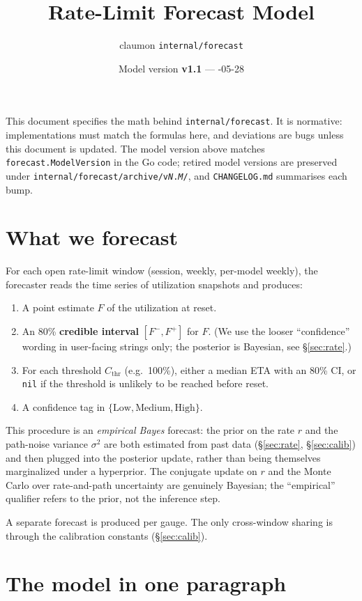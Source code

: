 \documentclass[11pt]{article}
\title{Rate-Limit Forecast Model}
\author{claumon \texttt{internal/forecast}}
\date{Model version \textbf{v1.1} \enspace --- \enspace 2026-05-28}
\newcommand{\Cthr}{C_{\text{thr}}}
\begin{document}
\maketitle

This document specifies the math behind \texttt{internal/forecast}. It is
normative: implementations must match the formulas here, and deviations are
bugs unless this document is updated. The model version above matches
\texttt{forecast.ModelVersion} in the Go code; retired model versions are
preserved under \texttt{internal/forecast/archive/v\textit{N}.\textit{M}/},
and \texttt{CHANGELOG.md} summarises each bump.

\section{What we forecast}

For each open rate-limit window (session, weekly, per-model weekly), the
forecaster reads the time series of utilization snapshots and produces:

\begin{enumerate}
  \item A point estimate $F$ of the utilization at reset.
  \item An 80\% \textbf{credible interval} $[F^-, F^+]$ for $F$. (We use the
    looser ``confidence'' wording in user-facing strings only; the posterior
    is Bayesian, see \S\ref{sec:rate}.)
  \item For each threshold $\Cthr$ (e.g.\ 100\%), either a median ETA with an
    80\% CI, or \texttt{nil} if the threshold is unlikely to be reached
    before reset.
  \item A confidence tag in $\{\text{Low}, \text{Medium}, \text{High}\}$.
\end{enumerate}

This procedure is an \emph{empirical Bayes} forecast: the prior on the rate
$r$ and the path-noise variance $\sigma^2$ are both estimated from past data
(\S\ref{sec:rate}, \S\ref{sec:calib}) and then plugged into the posterior
update, rather than being themselves marginalized under a hyperprior. The
conjugate update on $r$ and the Monte Carlo over rate-and-path uncertainty
are genuinely Bayesian; the ``empirical'' qualifier refers to the prior, not
the inference step.

A separate forecast is produced per gauge. The only cross-window sharing is
through the calibration constants (\S\ref{sec:calib}).

\section{The model in one paragraph}
\end{document}
